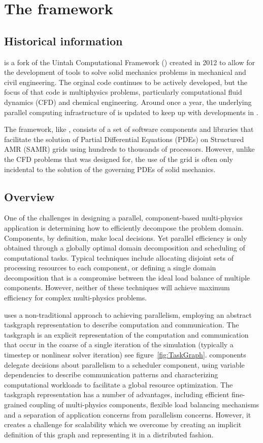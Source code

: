 \chapter{The \Vaango framework}

\section{Historical information}
\Vaango is a fork of the Uintah Computational Framework (\Uintah) created
in 2012 to allow for the development of tools to solve solid mechanics problems
in mechanical and civil engineering.
The orginal \Uintah code continues to be actively developed, but the focus
of that code is multiphysics problems, particularly computational fluid
dynamics (CFD) and chemical engineering.  Around once a year, the underlying 
parallel computing infrastructure of \Vaango is updated to keep up with 
developments in \Uintah.

The \Vaango framework, like \Uintah, consists of a
set of software components and libraries that facilitate the solution
of Partial Differential Equations (PDEs) on Structured AMR (SAMR)
grids using hundreds to thousands of processors.  However, unlike the
CFD problems that \Uintah was designed for, the use of the grid is
often only incidental to the solution of the governing PDEs of solid
mechanics.

\section{Overview}
One of the challenges in designing a parallel, component-based
multi-physics application is determining how to efficiently decompose
the problem domain. Components, by definition, make local
decisions. Yet parallel efficiency is only obtained through a globally
optimal domain decomposition and scheduling of computational
tasks. Typical techniques include allocating disjoint sets of
processing resources to each component, or defining a single domain
decomposition that is a compromise between the ideal load balance of
multiple components. However, neither of these techniques will achieve
maximum efficiency for complex multi-physics problems.

\Vaango uses a non-traditional approach to achieving parallelism,
employing an abstract taskgraph representation to describe computation
and communication. The taskgraph is an explicit representation of the
computation and communication that occur in the coarse of a single
iteration of the simulation (typically a timestep or nonlinear solver
iteration) see figure~\ref{fig:TaskGraph}. \Vaango components delegate
decisions about parallelism to a scheduler component, using variable
dependencies to describe communication patterns and characterizing
computational workloads to facilitate a global resource
optimization. The taskgraph representation has a number of advantages,
including efficient fine-grained coupling of multi-physics components,
flexible load balancing mechanisms and a separation of application
concerns from parallelism concerns. However, it creates a challenge
for scalability which we overcome by creating an implicit definition
of this graph and representing it in a distributed fashion.

